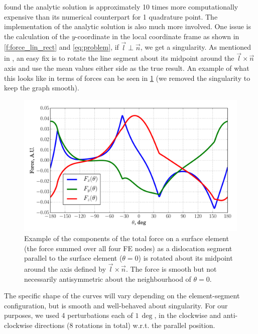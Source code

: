 \documentclass[11pt]{iopart}
\begin{document}
\citet{Queyreau} found the analytic solution is approximately 10 times more computationally expensive than its numerical counterpart for 1 quadrature point. The implementation of the analytic solution is also much more involved. One issue is the calculation of the $y$-coordinate in the local coordinate frame as shown in \cref{f:force_lin_rect} and \cref{eq:problem}, if $\vec{l} \perp \vec{n}$, we get a singularity. As mentioned in \cite{Queyreau}, an easy fix is to rotate the line segment about its midpoint around the $\vec{l} \times \vec{n}$ axis and use the mean values either side as the true result. An example of what this looks like in terms of forces can be seen in \cref{f:rotate} (we removed the singularity to keep the graph smooth).
\begin{figure}
    \centering
    \includegraphics[width=0.8\linewidth]{ftot_rotation_lin_rect.pdf}
    \caption{Example of the components of the total force on a surface element (the force summed over all four FE nodes) as a dislocation segment parallel to the surface element ($\theta = 0$) is rotated about its midpoint around the axis defined by $\vec{l}\times\vec{n}$. The force is smooth but not necessarily antisymmetric about the neighbourhood of $\theta=0$.}
    \label{f:rotate}
\end{figure}
The specific shape of the curves will vary depending on the element-segment configuration, but is smooth and well-behaved about singularity. For our purposes, we used 4 perturbations each of $1\,\deg$, in the clockwise and anti-clockwise directions (8 rotations in total) w.r.t. the parallel position.
\end{document}
